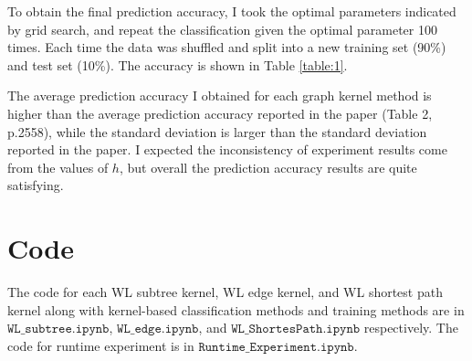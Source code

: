 \documentclass{llncs}
\begin{document}
To obtain the final prediction accuracy, I took the optimal parameters indicated by grid search, and repeat the classification given the optimal parameter 100 times. Each time the data was shuffled and split into a new training set (90\%) and test set (10\%). The accuracy is shown in Table \ref{table:1}. 

The average prediction accuracy I obtained for each graph kernel method is higher than the average prediction accuracy reported in the paper (Table 2, p.2558), while the standard deviation is larger than the standard deviation reported in the paper. I expected the inconsistency of experiment results come from the values of $h$, but overall the prediction accuracy results are quite satisfying. 



\section{Code}
The code for each WL subtree kernel, WL edge kernel, and WL shortest path kernel along with kernel-based classification methods and training methods are in $\texttt{WL\_subtree.ipynb}$, $\texttt{WL\_edge.ipynb}$, and $\texttt{WL\_ShortesPath.ipynb}$ respectively. The code for runtime experiment is in $\texttt{Runtime\_Experiment.ipynb}$. 
\end{document}
